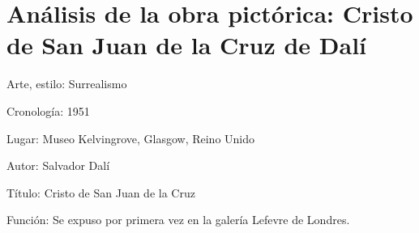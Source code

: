 \section{Análisis de la obra pictórica: Cristo de San Juan de la Cruz de Dalí}

Arte, estilo: Surrealismo

Cronología: 1951

Lugar: Museo Kelvingrove, Glasgow, Reino Unido

Autor: Salvador Dalí

Título: Cristo de San Juan de la Cruz

Función: Se expuso por primera vez en la galería Lefevre de Londres. %